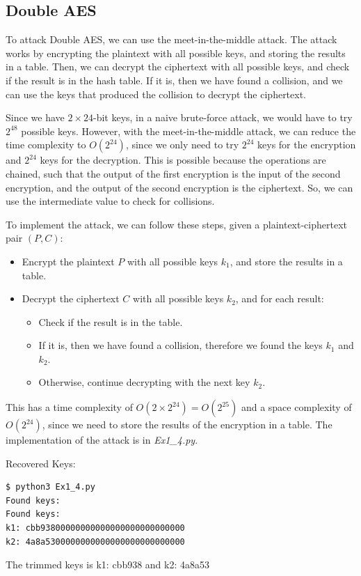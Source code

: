 \documentclass{article}
\begin{document}
\subsection{Double AES}
To attack Double AES, we can use the meet-in-the-middle attack.
The attack works by encrypting the plaintext with all possible keys, and storing the results in a table.
Then, we can decrypt the ciphertext with all possible keys, and check if the result is in the hash table.
If it is, then we have found a collision, and we can use the keys that produced the collision to decrypt the ciphertext.

Since we have $2 \times 24$-bit keys, in a naive brute-force attack, we would have to try $2^{48}$ possible keys.
However, with the meet-in-the-middle attack, we can reduce the time complexity to $O(2^{24})$, since we only need to try $2^{24}$ keys for the encryption and $2^{24}$ keys for the decryption.
This is possible because the operations are chained, such that the output of the first encryption is the input of the second encryption, and the output of the second encryption is the ciphertext. So, we can use the intermediate value to check for collisions.

To implement the attack, we can follow these steps, given a plaintext-ciphertext pair $(P, C)$:
\begin{itemize}
    \item Encrypt the plaintext $P$ with all possible keys $k_1$, and store the results in a table.
    \item Decrypt the ciphertext $C$ with all possible keys $k_2$, and for each result:
        \begin{itemize}
            \item Check if the result is in the table.
            \item If it is, then we have found a collision, therefore we found the keys $k_1$ and $k_2$.
            \item Otherwise, continue decrypting with the next key $k_2$.
        \end{itemize}
\end{itemize}
This has a time complexity of $O(2\times2^{24}) = O(2^{25})$ and a space complexity of $O(2^{24})$, since we need to store the results of the encryption in a table.
The implementation of the attack is in \textit{Ex1\_4.py}.

Recovered Keys:
\begin{lstlisting}[language=bash]
$ python3 Ex1_4.py
Found keys:
Found keys:
k1: cbb93800000000000000000000000000
k2: 4a8a5300000000000000000000000000
\end{lstlisting}
The trimmed keys is k1: cbb938 and k2: 4a8a53
\end{document}

